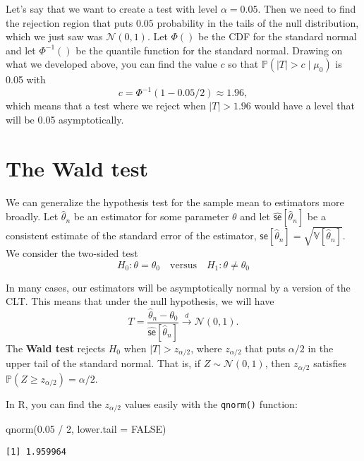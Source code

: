 \documentclass[
  letterpaper,
  DIV=11,
  numbers=noendperiod]{scrreprt}
\newenvironment{Shaded}{\begin{snugshade}}{\end{snugshade}}
\newcommand{\AttributeTok}[1]{\textcolor[rgb]{0.40,0.45,0.13}{#1}}
\newcommand{\ConstantTok}[1]{\textcolor[rgb]{0.56,0.35,0.01}{#1}}
\newcommand{\DecValTok}[1]{\textcolor[rgb]{0.68,0.00,0.00}{#1}}
\newcommand{\FloatTok}[1]{\textcolor[rgb]{0.68,0.00,0.00}{#1}}
\newcommand{\FunctionTok}[1]{\textcolor[rgb]{0.28,0.35,0.67}{#1}}
\newcommand{\NormalTok}[1]{\textcolor[rgb]{0.00,0.23,0.31}{#1}}
\newcommand{\SpecialCharTok}[1]{\textcolor[rgb]{0.37,0.37,0.37}{#1}}
\newcommand{\V}{\mathbb{V}}
\newcommand{\N}{\mathcal{N}}
\renewcommand{\P}{\mathbb{P}}
\newcommand{\indist}{\overset{d}{\to}}
\theoremstyle{definition}
\theoremstyle{plain}
\theoremstyle{definition}
\theoremstyle{remark}
\begin{document}
Let's say that we want to create a test with level \(\alpha = 0.05\).
Then we need to find the rejection region that puts \(0.05\) probability
in the tails of the null distribution, which we just saw was
\(\N(0,1)\). Let \(\Phi()\) be the CDF for the standard normal and let
\(\Phi^{-1}()\) be the quantile function for the standard normal.
Drawing on what we developed above, you can find the value \(c\) so that
\(\P(|T| > c \mid \mu_0)\) is 0.05 with \[
c = \Phi^{-1}(1 - 0.05/2) \approx 1.96,
\] which means that a test where we reject when \(|T| > 1.96\) would
have a level that will be 0.05 asymptotically.

\hypertarget{the-wald-test}{%
\section{The Wald test}\label{the-wald-test}}

We can generalize the hypothesis test for the sample mean to estimators
more broadly. Let \(\widehat{\theta}_n\) be an estimator for some
parameter \(\theta\) and let
\(\widehat{\textsf{se}}[\widehat{\theta}_n]\) be a consistent estimate
of the standard error of the estimator,
\(\textsf{se}[\widehat{\theta}_n] = \sqrt{\V[\widehat{\theta}_n]}\). We
consider the two-sided test \[
H_0: \theta = \theta_0 \quad\text{versus}\quad H_1: \theta \neq \theta_0
\]

In many cases, our estimators will be asymptotically normal by a version
of the CLT. This means that under the null hypothesis, we will have \[ 
T = \frac{\widehat{\theta}_n - \theta_0}{\widehat{\textsf{se}}[\widehat{\theta}_n]} \indist \N(0, 1). 
\] The \textbf{Wald test} rejects \(H_0\) when \(|T| > z_{\alpha/2}\),
where \(z_{\alpha/2}\) that puts \(\alpha/2\) in the upper tail of the
standard normal. That is, if \(Z \sim \N(0, 1)\), then \(z_{\alpha/2}\)
satisfies \(\P(Z \geq z_{\alpha/2}) = \alpha/2\).

\begin{tcolorbox}[enhanced jigsaw, title=\textcolor{quarto-callout-note-color}{\faInfo}\hspace{0.5em}{Note}, breakable, titlerule=0mm, opacityback=0, rightrule=.15mm, bottomrule=.15mm, colframe=quarto-callout-note-color-frame, coltitle=black, colbacktitle=quarto-callout-note-color!10!white, bottomtitle=1mm, toptitle=1mm, colback=white, arc=.35mm, opacitybacktitle=0.6, toprule=.15mm, leftrule=.75mm, left=2mm]

In R, you can find the \(z_{\alpha/2}\) values easily with the
\texttt{qnorm()} function:

\begin{Shaded}
\begin{Highlighting}[]
\FunctionTok{qnorm}\NormalTok{(}\FloatTok{0.05} \SpecialCharTok{/} \DecValTok{2}\NormalTok{, }\AttributeTok{lower.tail =} \ConstantTok{FALSE}\NormalTok{)}
\end{Highlighting}
\end{Shaded}

\begin{verbatim}
[1] 1.959964
\end{verbatim}

\end{tcolorbox}
\end{document}

